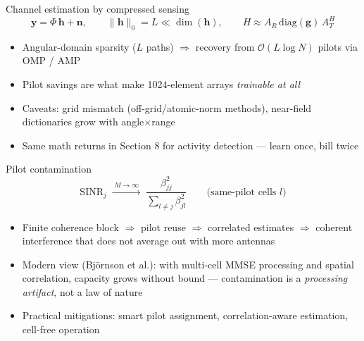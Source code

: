 \begin{frame}{Channel estimation by compressed sensing}
  \begin{equation*}
    \mathbf y=\Phi\,\mathbf h+\mathbf n,\qquad
    \|\mathbf h\|_0=L\ll\dim(\mathbf h),\qquad
    H\approx A_R\,\mathrm{diag}(\mathbf g)\,A_T^{H}
  \end{equation*}
  \begin{itemize}\itemsep2pt
    \item Angular-domain sparsity ($L$ paths) $\Rightarrow$ recovery from
          $\mathcal O(L\log N)$ pilots via OMP / AMP
    \item Pilot savings are what make 1024-element arrays \emph{trainable at
          all}
    \item Caveats: grid mismatch (off-grid/atomic-norm methods), near-field
          dictionaries grow with angle$\times$range
    \item Same math returns in Section 8 for activity detection --- learn once,
          bill twice
  \end{itemize}
\end{frame}

\begin{frame}{Pilot contamination}
  \begin{equation*}
    \mathrm{SINR}_j\;\xrightarrow{\;M\to\infty\;}\;
    \frac{\beta_{jj}^{2}}{\sum_{l\neq j}\beta_{jl}^{2}}
    \qquad\text{(same-pilot cells }l\text{)}
  \end{equation*}
  \begin{itemize}\itemsep2pt
    \item Finite coherence block $\Rightarrow$ pilot reuse $\Rightarrow$
          correlated estimates $\Rightarrow$ coherent interference that does
          \alert{not} average out with more antennas
    \item Modern view (Bj\"ornson et al.): with multi-cell MMSE processing and
          spatial correlation, capacity grows without bound ---
          contamination is a \emph{processing artifact}, not a law of nature
    \item Practical mitigations: smart pilot assignment, correlation-aware
          estimation, cell-free operation
  \end{itemize}
\end{frame}

